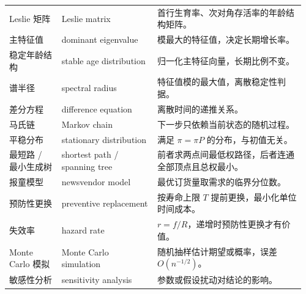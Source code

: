 \documentclass[UTF8,11pt,a4paper]{ctexart}
\begin{document}
\begin{tabular}{@{}p{0.17\linewidth}p{0.31\linewidth}p{0.48\linewidth}@{}}
Leslie 矩阵 & Leslie matrix & 首行生育率、次对角存活率的年龄结构矩阵。 \\
主特征值 & dominant eigenvalue & 模最大的特征值，决定长期增长率。 \\
稳定年龄结构 & stable age distribution & 归一化主特征向量，长期比例不变。 \\
谱半径 & spectral radius & 特征值模的最大值，离散稳定性判据。 \\
差分方程 & difference equation & 离散时间的递推关系。 \\
马氏链 & Markov chain & 下一步只依赖当前状态的随机过程。 \\
平稳分布 & stationary distribution & 满足 $\pi=\pi P$ 的分布，与初值无关。 \\
最短路 / 最小生成树 & shortest path / spanning tree & 前者求两点间最低权路径，后者连通全部顶点且总权最小。 \\
报童模型 & newsvendor model & 最优订货量取需求的临界分位数。 \\
预防性更换 & preventive replacement & 按寿命上限 $T$ 提前更换，最小化单位时间成本。 \\
失效率 & hazard rate & $r=f/R$，递增时预防性更换才有价值。 \\
Monte Carlo 模拟 & Monte Carlo simulation & 随机抽样估计期望或概率，误差 $O(n^{-1/2})$。 \\
敏感性分析 & sensitivity analysis & 参数或假设扰动对结论的影响。 \\
\hline
\end{tabular}
\par\normalsize\renewcommand{\arraystretch}{1}\setlength{\tabcolsep}{6pt}
\end{document}
